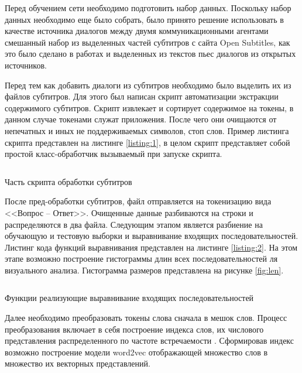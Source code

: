 Перед обучением сети необходимо подготовить набор данных. Поскольку набор данных необходимо еще было собрать, было принято решение использовать в качестве источника диалогов между двумя коммуникационными агентами смешанный набор из выделенных частей субтитров с сайта Open Subtitles, как это было сделано в работах \cite{creutz2018open, arcan2016asistent} и выделенных из текстов пьес диалогов из открытых источников. 

Перед тем как добавить диалоги из субтитров необходимо было выделить их из файлов субтитров. Для этого был написан скрипт автоматизации экстракции содержимого субтитров. Скрипт извлекает и сортирует содержимое на токены, в данном случае токенами служат приложения. После чего они очищаются от непечатных и иных не поддерживаемых символов, стоп слов. Пример листинга скрипта представлен на листинге \ref{listing:1}, в целом скрипт представляет собой простой класс-обработчик вызываемый при запуске скрипта. 

\begin{listing}[H]
\inputminted[breaklines, breakanywhere, linenos, fontsize=\small]{python}{source/prepare_subtitles.py}
\caption{Часть скрипта обработки субтитров}
\label{listing:1}
\end{listing}

После пред-обработки субтитров, файл отправляется на токенизацию вида <<Вопрос – Ответ>>. Очищенные данные разбиваются на строки и распределяются в два файла. Следующим этапом является разбиение на обучающую и тестовую выборки и выравнивание входящих последовательностей. Листинг кода функций выравнивания представлен на листинге \ref{listing:2}. На этом этапе возможно построение гистограммы длин всех последовательностей ля визуального анализа. Гистограмма размеров представлена на рисунке \ref{fig:len}. 

\begin{listing}[H]
   \inputminted[breaklines, breakanywhere, linenos, fontsize=\small]{python}{source/padding.py}
\caption{Функции реализующие выравнивание входящих последовательностей}
\label{listing:2}
\end{listing}

Далее необходимо преобразовать токены слова сначала в мешок слов. Процесс преобразования включает в себя построение индекса слов, их числового представления распределенного по частоте встречаемости \cite{zhao2017bagwords}. Сформировав индекс возможно построение модели word2vec отображающей множество слов в множество их векторных представлений.

